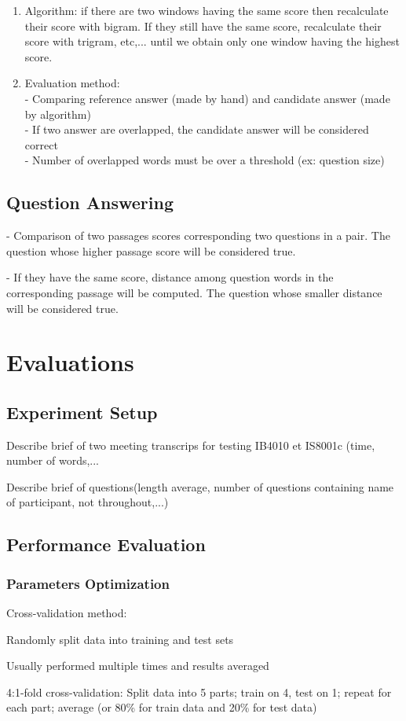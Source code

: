\documentclass[10pt,a4paper]{article}
\begin{document}
\begin{enumerate}
		
\item{Algorithm: if there are two windows having the same score then recalculate their score with bigram. If they still have the same score, recalculate their score with trigram, etc,... until we obtain only one window having the highest score.}
		
\item {Evaluation method: \\
		- Comparing reference answer (made by hand) and candidate answer (made by algorithm)\\
		- If two answer are overlapped, the candidate answer will be considered correct\\
		- Number of overlapped words must be over a threshold (ex: question size)}
\end{enumerate}


\subsection{Question Answering}
- Comparison of two passages scores corresponding two questions in a pair. The question whose higher passage score will be considered true.

- If they have the same score, distance among question words in the corresponding passage will be computed. The question whose smaller distance will be considered true.


\section{Evaluations}
\subsection{Experiment Setup}
\begin{list}{}{}
\item {Describe brief of two meeting transcrips for testing IB4010 et IS8001c (time, number of words,... }
\item {Describe brief of questions(length average, number of questions containing name of participant, not throughout,...)}
\end{list}

\subsection{Performance Evaluation}

\subsubsection{Parameters Optimization}
Cross-validation method: 
\begin{list}{}{}
\item {Randomly split data into training and test sets}
\item {Usually performed multiple times and results averaged}
\item {4:1-fold cross-validation: Split data into 5 parts; train on 4, test on 1; repeat for each part; average (or 80\% for train data and 20\% for test data)}
\end{list}
\end{document}
